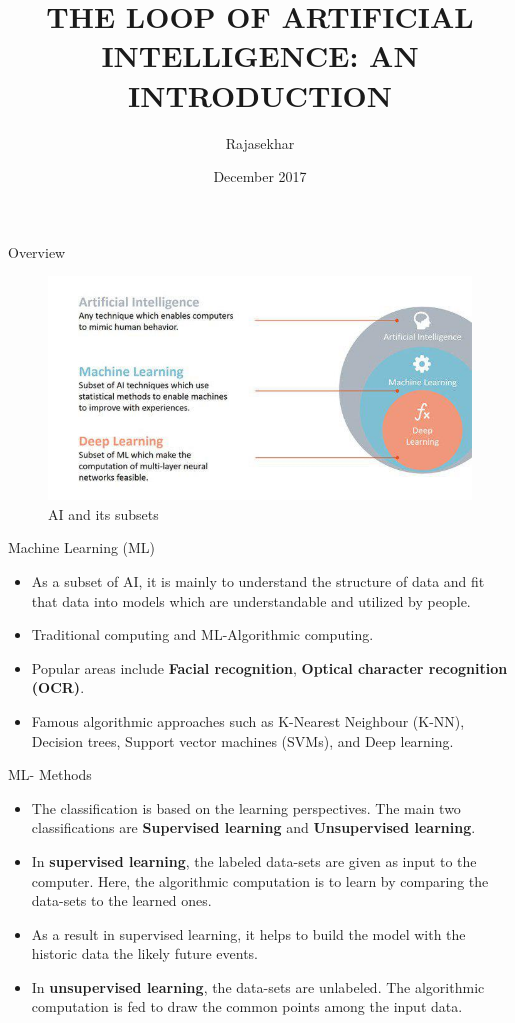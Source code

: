 \documentclass{beamer}
\title{THE LOOP OF ARTIFICIAL INTELLIGENCE: AN INTRODUCTION}
\author{Rajasekhar}
\institute[Asian Institute of Technology]
{\inst{}Department of Information and Communication Technology\\Asian Institute of Technology, Thailand}
\date{December 2017}
\begin{document}
\begin{frame}
  \titlepage
\end{frame}
\begin{frame}{Overview}
 \begin{figure}
     \centering
     \includegraphics[width=4in\textwidth]{fig/ai-ml.jpg}
     \caption{AI and its subsets}
     \label{fig:AI and its subsets}
 \end{figure}
\end{frame}
\begin{frame}{Machine Learning (ML)}
  \begin{itemize}
  \item As a subset of AI, it is mainly to understand the structure of data and fit that data into models which are understandable and utilized by people. 
  \item Traditional computing and ML-Algorithmic computing.
  \item Popular areas include \textbf{Facial recognition}, \textbf{Optical character recognition (OCR)}.
  \item Famous algorithmic approaches such as K-Nearest Neighbour (K-NN), Decision trees, Support vector machines (SVMs), and Deep learning.
  \end{itemize}
\end{frame}
\begin{frame}{ML- Methods}
    \begin{itemize}
    \item The classification is based on the learning perspectives. The main two classifications are \textbf{Supervised learning} and \textbf{Unsupervised learning}.
    \item In \textbf{supervised learning}, the labeled data-sets are given as input to the computer. Here, the algorithmic computation is to learn by comparing the data-sets to the learned ones. 
    \item As a result in supervised learning, it helps to build the model with the historic data the likely future events.
    \item In \textbf{unsupervised learning}, the data-sets are unlabeled. The algorithmic computation is fed to draw the common points among the input data. 
    \end{itemize}
\end{frame}
\end{document}

